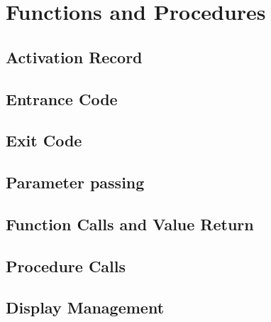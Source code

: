 \section{Functions and Procedures}
\subsection{Activation Record}
\subsection{Entrance Code}
\subsection{Exit Code}
\subsection{Parameter passing}
\subsection{Function Calls and Value Return}
\subsection{Procedure Calls}
\subsection{Display Management}
